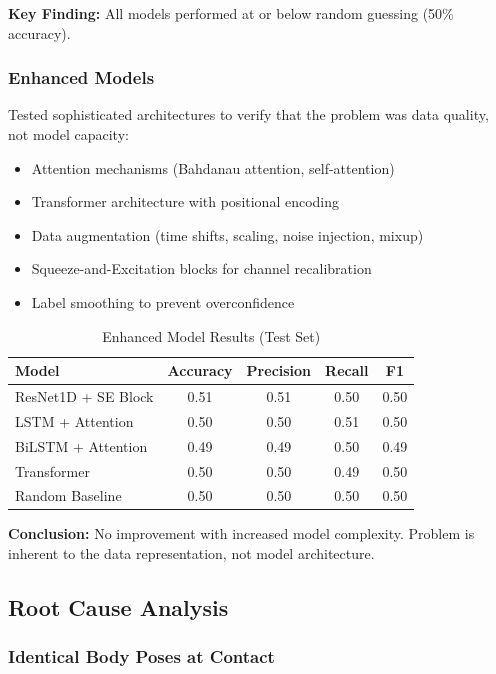 \documentclass[12pt,a4paper]{article}
\begin{document}
\textbf{Key Finding:} All models performed at or below random guessing (50\% accuracy).

\subsubsection{Enhanced Models}

Tested sophisticated architectures to verify that the problem was data quality, not model capacity:

\begin{itemize}
\item Attention mechanisms (Bahdanau attention, self-attention)
\item Transformer architecture with positional encoding
\item Data augmentation (time shifts, scaling, noise injection, mixup)
\item Squeeze-and-Excitation blocks for channel recalibration
\item Label smoothing to prevent overconfidence
\end{itemize}

\begin{table}[H]
\centering
\caption{Enhanced Model Results (Test Set)}
\begin{tabular}{lcccc}
\toprule
Model & Accuracy & Precision & Recall & F1 \\
\midrule
ResNet1D + SE Block & 0.51 & 0.51 & 0.50 & 0.50 \\
LSTM + Attention & 0.50 & 0.50 & 0.51 & 0.50 \\
BiLSTM + Attention & 0.49 & 0.49 & 0.50 & 0.49 \\
Transformer & 0.50 & 0.50 & 0.49 & 0.50 \\
\midrule
Random Baseline & 0.50 & 0.50 & 0.50 & 0.50 \\
\bottomrule
\end{tabular}
\end{table}

\textbf{Conclusion:} No improvement with increased model complexity. Problem is inherent to the data representation, not model architecture.

\subsection{Root Cause Analysis}

\subsubsection{Identical Body Poses at Contact}
\end{document}
